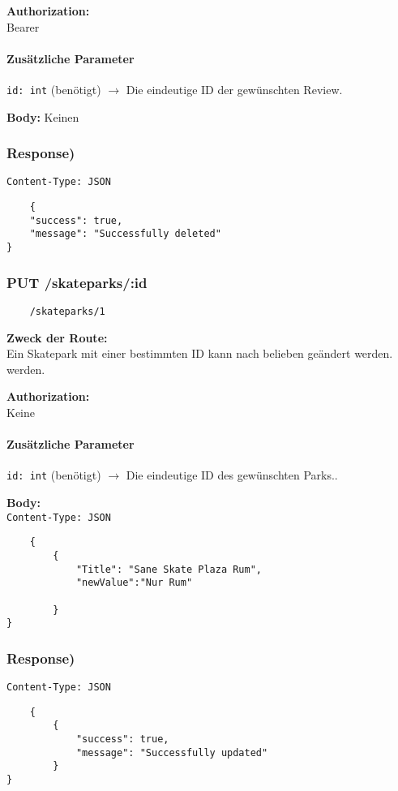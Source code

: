 \textbf{Authorization:} \\
Bearer

\paragraph{Zusätzliche Parameter}
\lstinline{id: int} (benötigt)
$\rightarrow$ Die eindeutige ID der gewünschten Review.

\textbf{Body:}
Keinen


\subsubsection{Response)}

\lstinline{Content-Type: JSON}
\begin{lstlisting}
    {
    "success": true,
    "message": "Successfully deleted"
}
\end{lstlisting}

\pagebreak


\subsubsection{PUT /skateparks/:id}

\begin{lstlisting}
    /skateparks/1
\end{lstlisting}

\textbf{Zweck der Route:} \\
Ein Skatepark mit einer bestimmten ID kann nach belieben geändert werden.
werden.

\textbf{Authorization:} \\
Keine

\paragraph{Zusätzliche Parameter}
\lstinline{id: int} (benötigt)
$\rightarrow$ Die eindeutige ID des gewünschten Parks..

\textbf{Body:}\\
\lstinline{Content-Type: JSON}
\begin{lstlisting}
    {
        {
            "Title": "Sane Skate Plaza Rum",
            "newValue":"Nur Rum"

        }
}
\end{lstlisting}

\subsubsection{Response)}

\lstinline{Content-Type: JSON}
\begin{lstlisting}
    {
        {
            "success": true,
            "message": "Successfully updated"
        }
}
\end{lstlisting}

\pagebreak


